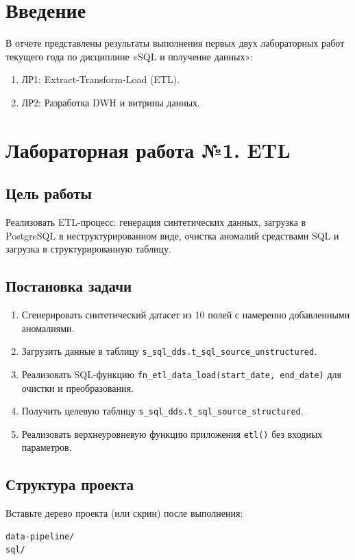 \documentclass[14pt,a4paper]{extarticle}
\begin{document}
\tableofcontents
\newpage

\section*{Введение}
В отчете представлены результаты выполнения первых двух лабораторных работ текущего года по дисциплине «SQL и получение данных»:
\begin{enumerate}
    \item ЛР1: Extract-Transform-Load (ETL).
    \item ЛР2: Разработка DWH и витрины данных.
\end{enumerate}

\section{Лабораторная работа №1. ETL}

\subsection{Цель работы}
Реализовать ETL-процесс: генерация синтетических данных, загрузка в PostgreSQL в неструктурированном виде, очистка аномалий средствами SQL и загрузка в структурированную таблицу.

\subsection{Постановка задачи}
\begin{enumerate}
    \item Сгенерировать синтетический датасет из 10 полей с намеренно добавленными аномалиями.
    \item Загрузить данные в таблицу \texttt{s\_sql\_dds.t\_sql\_source\_unstructured}.
    \item Реализовать SQL-функцию \texttt{fn\_etl\_data\_load(start\_date, end\_date)} для очистки и преобразования.
    \item Получить целевую таблицу \texttt{s\_sql\_dds.t\_sql\_source\_structured}.
    \item Реализовать верхнеуровневую функцию приложения \texttt{etl()} без входных параметров.
\end{enumerate}

\subsection{Структура проекта}
Вставьте дерево проекта (или скрин) после выполнения:
\begin{verbatim}
data-pipeline/
sql/
\end{verbatim}
\end{document}
